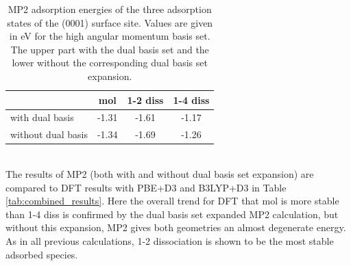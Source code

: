 \documentclass[11pt,DIV=13,BCOR=5mm,a4paper,headinclude]{scrbook}
\begin{document}
\begin{table}[!h]
  \centering
   \caption{MP2 adsorption energies of the three adsorption states of the (0001) surface site.
Values are given in eV for the high angular momentum basis set.
The upper part with the dual basis set and the lower without the corresponding dual basis set expansion.}
  \begin{tabular}{l|ccc}
  \toprule
   &mol & 1-2 diss & 1-4 diss \\\midrule %
  with dual basis & -1.31 & -1.61 & -1.17\\\midrule
  without dual basis & -1.34 & -1.69 & -1.26 \\\bottomrule
  \end{tabular}
  \label{tab:MP2_minima}
 \end{table}
 \\
The results of MP2 (both with and without dual basis set expansion) are compared to DFT results with PBE+D3 and B3LYP+D3 in Table \ref{tab:combined_results}.
Here the overall trend for DFT that mol is more stable than 1-4 diss is confirmed by the dual basis set expanded MP2 calculation, but without this expansion, MP2 gives both geometries an almost degenerate energy.
As in all previous calculations, 1-2 dissociation is shown to be the most stable  adsorbed species.
 
\end{document}
